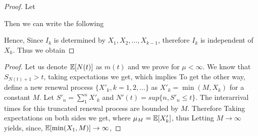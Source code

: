 \documentclass[all-lectures.tex]{subfiles}
\begin{document}
\begin{proof}
Let 

Then we can write the following

Hence,
Since $I_k$ is determined by $X_1, X_2, \dots, X_{k-1}$, therefore $I_k$ is independent of $X_k$. Thus we obtain
\end{proof}

\begin{thm}
\end{thm}
\begin{proof}
Let us denote $\mathbb{E}[N(t)]$ as $m(t)$ and we prove for $\mu < \infty$. We know that $S_{N(t)+1} > t$, taking expectations we get,
which implies 
To get the other way, define a new renewal process $\{ X'_k, k=1,2,\dots \}$ as $X'_k= \min(M,X_k)$ for a constant $M$.
Let $S'_n=\sum_1^n X'_k$ and $N'(t) = sup\{n,S'_n \le t\}$. The interarrival times for this truncated renewal process are bounded by $M$. Therefore
Taking expectations on both sides we get,
where $\mu_M = \mathbb{E}[X'_k]$, thus
Letting $M \to \infty$ yields, since, $\mathbb{E}[\min(X_1,M)] \to \infty$,
\end{proof}
\end{document}

